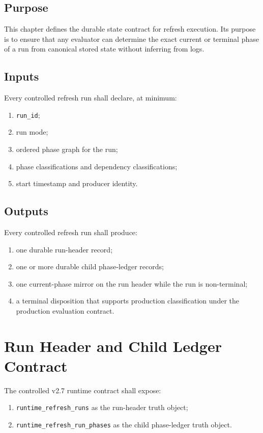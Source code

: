 \documentclass[11pt]{report}
\begin{document}
\subsection{Purpose}
This chapter defines the durable state contract for refresh execution. Its purpose is to ensure that any evaluator can determine the exact current or terminal phase of a run from canonical stored state without inferring from logs.

\subsection{Inputs}
Every controlled refresh run shall declare, at minimum:
\begin{enumerate}[leftmargin=1.2cm]
    \item \texttt{run\_id};
    \item run mode;
    \item ordered phase graph for the run;
    \item phase classifications and dependency classifications;
    \item start timestamp and producer identity.
\end{enumerate}

\subsection{Outputs}
Every controlled refresh run shall produce:
\begin{enumerate}[leftmargin=1.2cm]
    \item one durable run-header record;
    \item one or more durable child phase-ledger records;
    \item one current-phase mirror on the run header while the run is non-terminal;
    \item a terminal disposition that supports production classification under the production evaluation contract.
\end{enumerate}

\section{Run Header and Child Ledger Contract}
The controlled v2.7 runtime contract shall expose:
\begin{enumerate}[leftmargin=1.2cm]
    \item \texttt{runtime\_refresh\_runs} as the run-header truth object;
    \item \texttt{runtime\_refresh\_run\_phases} as the child phase-ledger truth object.
\end{enumerate}
\end{document}
